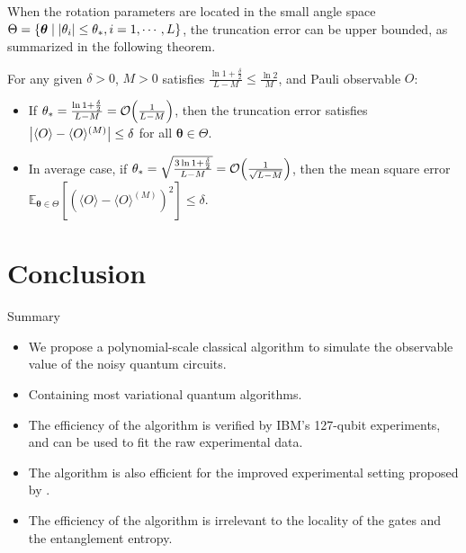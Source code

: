 \documentclass[10pt]{beamer}
\begin{document}
\begin{CJK}{UTF8}{gbsn}
 \begin{frame}[fragile]
  When the rotation parameters are located in the small angle space $\Theta=\{\bm{\theta}\mid \abs{\theta_i}\leq \theta_* ,i=1,\cdots,L \}$, the truncation error can be upper bounded, as summarized in the following theorem. 
  \begin{mdframed}
    \begin{theorem}\label{thm:truncation_error}
      For any given $\delta>0$, $M>0$ satisfies $\frac{\ln{1+\frac{\delta}{2}}}{L-M}\leq \frac{\ln{2}}{M}$, and Pauli observable $O$:
    \begin{itemize}
      \item If $\theta_*=\frac{\ln{1+\frac{\delta}{2}}}{L-M}=\order{\frac{1}{L-M}}$, then the truncation error satisfies $\abs{\langle O \rangle - \langle O \rangle ^{(M)}}\leq \delta$ for all $\bm{\theta}\in \Theta$.
      \item In average case, if $\theta_*=\sqrt{\frac{3\ln{1+\frac{\delta}{2}}}{L-M}}=\order{\frac{1}{\sqrt{L-M}}}$, then the mean square error $\mathbb{E}_{\bm{\theta}\in \Theta}[(\langle O \rangle - \langle O \rangle ^{(M)})^2]\leq \delta$.
    \end{itemize} 
    \end{theorem}
  \end{mdframed}
  \vspace{0em}
\end{frame}




\section{Conclusion}

\begin{frame}[fragile]{Summary}
  \begin{itemize}
    \item We propose a polynomial-scale classical algorithm to simulate the observable value of the noisy quantum circuits.
    \item  Containing most variational quantum algorithms.
    \item The efficiency of the algorithm is verified by IBM's 127-qubit experiments, and can be used to fit the raw experimental data.
    \item The algorithm is also efficient for the improved experimental setting proposed by \cite{anand2023classical}.
    \item The efficiency of the algorithm is irrelevant to the locality of the gates and the entanglement entropy. 
  \end{itemize}
\end{frame}
\end{CJK}
\end{document}
